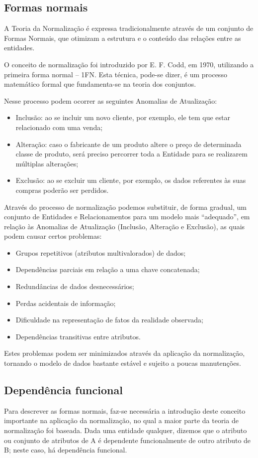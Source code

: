 \documentclass{article}
\begin{document}
\subsection{Formas normais}
A Teoria da Normalização é expressa tradicionalmente através de um conjunto de Formas Normais, que otimizam a estrutura e o conteúdo das relações entre as entidades.

O conceito de normalização foi introduzido por E. F. Codd, em 1970, utilizando a primeira forma normal – 1FN. Esta técnica, pode-se dizer, é um processo matemático formal que fundamenta-se na teoria dos conjuntos.

Nesse processo podem ocorrer as seguintes Anomalias de Atualização:
\begin{itemize}
    \item Inclusão: ao se incluir um novo cliente, por exemplo, ele tem que estar relacionado com uma venda;
    \item Alteração: caso o fabricante de um produto altere o preço de determinada classe de produto, será preciso percorrer toda a Entidade para se realizarem múltiplas alterações;
    \item Exclusão: ao se excluir um cliente, por exemplo, os dados referentes às suas compras poderão ser perdidos.
\end{itemize}
Através do processo de normalização podemos substituir, de forma gradual, um conjunto de Entidades e Relacionamentos para um modelo mais “adequado”, em relação às Anomalias de Atualização (Inclusão, Alteração e Exclusão), as quais podem causar certos problemas:
\begin{itemize}
    \item Grupos repetitivos (atributos multivalorados) de dados;
    \item Dependências parciais em relação a uma chave concatenada;
    \item Redundâncias de dados desnecessários;
    \item Perdas acidentais de informação;
    \item Dificuldade na representação de fatos da realidade observada;
    \item Dependências transitivas entre atributos.
\end{itemize}
Estes problemas podem ser minimizados através da aplicação da normalização, tornando o modelo de dados bastante estável e sujeito a poucas manutenções.

\subsection{Dependência funcional}
Para descrever as formas normais, faz-se necessária a introdução deste conceito importante na aplicação da normalização, no qual a maior parte da teoria de normalização foi baseada.
Dada uma entidade qualquer, dizemos que o atributo ou conjunto de atributos de A é dependente funcionalmente de outro atributo de B; neste caso, há dependência funcional.
\end{document}
